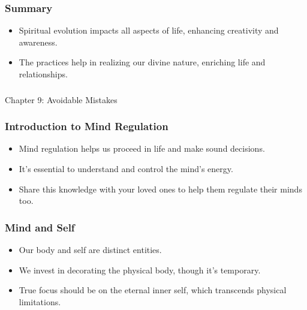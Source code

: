 \begin{frame}[fragile]\frametitle{Summary}
    \begin{itemize}
        \item Spiritual evolution impacts all aspects of life, enhancing creativity and awareness.
        \item The practices help in realizing our divine nature, enriching life and relationships.
    \end{itemize}
\end{frame}


\begin{frame}[fragile]\frametitle{}
\begin{center}
{\Large Chapter 9: Avoidable Mistakes }
\end{center}
\end{frame}

\begin{frame}[fragile]\frametitle{Introduction to Mind Regulation}
    \begin{itemize}
        \item Mind regulation helps us proceed in life and make sound decisions.
        \item It's essential to understand and control the mind’s energy.
        \item Share this knowledge with your loved ones to help them regulate their minds too.
    \end{itemize}
\end{frame}

\begin{frame}[fragile]\frametitle{Mind and Self}
    \begin{itemize}
        \item Our body and self are distinct entities.
        \item We invest in decorating the physical body, though it’s temporary.
        \item True focus should be on the eternal inner self, which transcends physical limitations.
    \end{itemize}
\end{frame}


